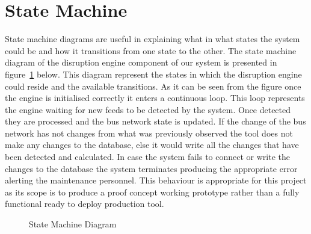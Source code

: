 \section{State Machine}
State machine diagrams are useful in explaining what in what states the system could be and how it transitions from one state to the other. The state machine diagram of the disruption engine component of our system is presented in figure~\ref{fig:stateMachine} below. This diagram represent the states in which the disruption engine could reside and the available transitions. As it can be seen from the figure once the engine is initialised correctly it enters a continuous loop. This loop represents the engine waiting for new feeds to be detected by the system. Once detected they are processed and the bus network state is updated. If the change of the bus network has not changes from what was previously observed the tool does not make any changes to the database, else it would write all the changes that have been detected and calculated. In case the system fails to connect or write the changes to the database the system terminates producing the appropriate error alerting the maintenance personnel. This behaviour is appropriate for this project as its scope is to produce a proof concept working prototype rather than a fully functional ready to deploy production tool.

\begin{figure}
	\caption{State Machine Diagram}
\label{fig:stateMachine}
\end{figure}

